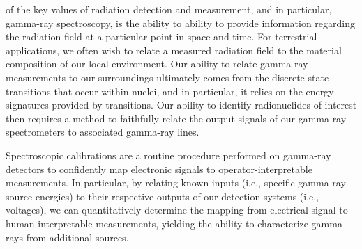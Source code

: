  of the key values of radiation detection and measurement, and in particular, gamma-ray spectroscopy, is the ability to ability to provide information regarding the radiation field at a particular point in space and time.
For terrestrial applications, we often wish to relate a measured radiation field to the material composition of our local environment.
Our ability to relate gamma-ray measurements to our surroundings ultimately comes from the discrete state transitions that occur within nuclei, and in particular, it relies on the energy signatures provided by transitions.
Our ability to identify radionuclides of interest then requires a method to faithfully relate the output signals of our gamma-ray spectrometers to associated gamma-ray lines.

Spectroscopic calibrations are a routine procedure performed on gamma-ray detectors to confidently map electronic signals to operator-interpretable measurements.
In particular, by relating known inputs (i.e., specific gamma-ray source energies) to their respective outputs of our detection systems (i.e., voltages), we can quantitatively determine the mapping from electrical signal to human-interpretable measurements, yielding the ability to characterize gamma rays from additional sources.
